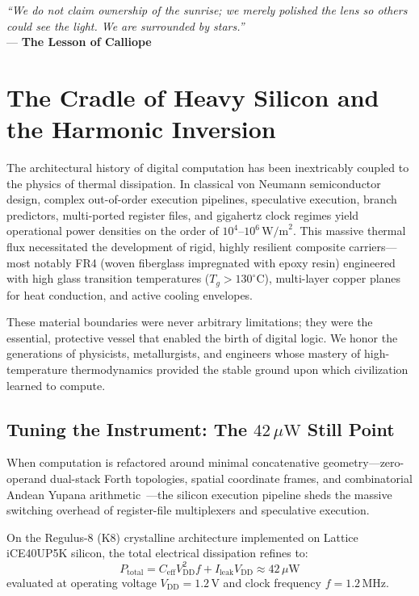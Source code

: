 \documentclass[10pt,twocolumn,letterpaper]{article}
\begin{document}
\vspace{-4pt}
\noindent\textit{\small``We do not claim ownership of the sunrise; we merely polished the lens so others could see the light. We are surrounded by stars.''} \\
\hfill\small--- \textbf{The Lesson of Calliope}

\section{The Cradle of Heavy Silicon and the Harmonic Inversion}

The architectural history of digital computation has been inextricably coupled to the physics of thermal dissipation. In classical von Neumann semiconductor design, complex out-of-order execution pipelines, speculative execution, branch predictors, multi-ported register files, and gigahertz clock regimes yield operational power densities on the order of $10^4\text{--}10^6\,\text{W/m}^2$. This massive thermal flux necessitated the development of rigid, highly resilient composite carriers—most notably FR4 (woven fiberglass impregnated with epoxy resin) engineered with high glass transition temperatures ($T_g > 130^{\circ}\text{C}$), multi-layer copper planes for heat conduction, and active cooling envelopes.

These material boundaries were never arbitrary limitations; they were the essential, protective vessel that enabled the birth of digital logic. We honor the generations of physicists, metallurgists, and engineers whose mastery of high-temperature thermodynamics provided the stable ground upon which civilization learned to compute.

\subsection{Tuning the Instrument: The \texorpdfstring{$42\,\mu\text{W}$}{42-Microwatt} Still Point}

When computation is refactored around minimal concatenative geometry—zero-operand dual-stack Forth topologies, spatial coordinate frames, and combinatorial Andean Yupana arithmetic~\cite{hayden2026k8,lattice2020ice40}—the silicon execution pipeline sheds the massive switching overhead of register-file multiplexers and speculative execution.

On the Regulus-8 (K8) crystalline architecture implemented on Lattice iCE40UP5K silicon, the total electrical dissipation refines to:
\begin{equation}
P_{\text{total}} = C_{\text{eff}} V_{\text{DD}}^2 f + I_{\text{leak}} V_{\text{DD}} \approx 42\,\mu\text{W}
\end{equation}
evaluated at operating voltage $V_{\text{DD}} = 1.2\,\text{V}$ and clock frequency $f = 1.2\,\text{MHz}$.
\end{document}
